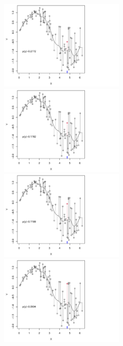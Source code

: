 \documentclass{article}
\begin{document}
\begin{figure}[p]
\centering
\hspace{-10pt}
\includegraphics[width=0.55\textwidth]{fig_full/5.pdf} 
\hspace{-50pt}
\includegraphics[width=0.55\textwidth]{fig_full/9.pdf} \\
\hspace{-10pt}
\includegraphics[width=0.55\textwidth]{fig_full/13.pdf} 
\hspace{-50pt}
\includegraphics[width=0.55\textwidth]{fig_full/18.pdf} \\

\end{figure}
\end{document}
